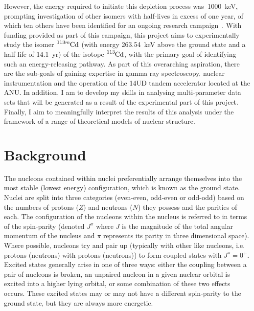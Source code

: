 \documentclass[12pt,a4paper]{article}
\begin{document}
\medskip
However, the energy required to initiate this depletion process was $~$1000~keV, prompting investigation of other isomers with half-lives in excess of one year, of which ten others have been identified for an ongoing research campaign~\cite{shaffer_innovations_2018}. %
With funding provided as part of this campaign, this project aims to experimentally study the isomer $\ce{^{113m}Cd}$ (with energy 263.54~keV above the ground state and a half-life of 14.1~yr) of the isotope $\ce{^{113}Cd}$, with the primary goal of identifying such an energy-releasing pathway. As part of this overarching aspiration, there are the sub-goals of gaining expertise in gamma ray spectroscopy, nuclear instrumentation and the operation of the 14UD tandem accelerator located at the ANU. In addition, I am to develop my skills in analysing multi-parameter data sets that will be generated as a result of the experimental part of this project. Finally, I aim to meaningfully interpret the results of this analysis under the framework of a range of theoretical models of nuclear structure.


\section*{Background}

\medskip
The nucleons contained within nuclei preferentially arrange themselves into the most stable (lowest energy) configuration, which is known as the ground state.
Nuclei are split into three categories (even-even, odd-even or odd-odd) based on the numbers of protons ($Z$) and neutrons ($N$) they possess and the parities of each.
The configuration of the nucleons within the nucleus is referred to in terms of the spin-parity (denoted $J^\pi$ where $J$ is the magnitude of the total angular momentum of the nucleus and $\pi$ represents its parity in three dimensional space). 
Where possible, nucleons try and pair up (typically with other like nucleons, i.e. protons (neutrons) with protons (neutrons)) to form coupled states with $J^\pi = 0^+$. 
Excited states generally arise in one of three ways: either the coupling between a pair of nucleons is broken, an unpaired nucleon in a given nuclear orbital is excited into a higher lying orbital, or some combination of these two effects occurs. 
These excited states may or may not have a different spin-parity to the ground state, but they are always more energetic.
\end{document}
